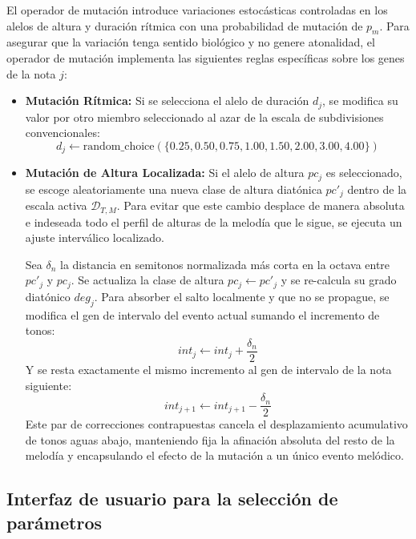 \documentclass[12pt]{report}
\begin{document}
El operador de mutación introduce variaciones estocásticas controladas en los alelos de altura y duración rítmica con una probabilidad de mutación de $p_m$. Para asegurar que la variación tenga sentido biológico y no genere atonalidad, el operador de mutación implementa las siguientes reglas específicas sobre los genes de la nota $j$:
\begin{itemize}
    \item \textbf{Mutación Rítmica:} Si se selecciona el alelo de duración $d_j$, se modifica su valor por otro miembro seleccionado al azar de la escala de subdivisiones convencionales:
    \begin{equation}
        d_j \leftarrow \text{random\_choice}(\{0.25, 0.50, 0.75, 1.00, 1.50, 2.00, 3.00, 4.00\})
    \end{equation}
    \item \textbf{Mutación de Altura Localizada:} Si el alelo de altura $pc_j$ es seleccionado, se escoge aleatoriamente una nueva clase de altura diatónica $pc'_j$ dentro de la escala activa $\mathcal{D}_{T,M}$. Para evitar que este cambio desplace de manera absoluta e indeseada todo el perfil de alturas de la melodía que le sigue, se ejecuta un ajuste interválico localizado. 
    
    Sea $\delta_n$ la distancia en semitonos normalizada más corta en la octava entre $pc'_j$ y $pc_j$. Se actualiza la clase de altura $pc_j \leftarrow pc'_j$ y se re-calcula su grado diatónico $deg_j$. Para absorber el salto localmente y que no se propague, se modifica el gen de intervalo del evento actual sumando el incremento de tonos:
    \begin{equation}
        int_j \leftarrow int_j + \frac{\delta_n}{2}
    \end{equation}
    Y se resta exactamente el mismo incremento al gen de intervalo de la nota siguiente:
    \begin{equation}
        int_{j+1} \leftarrow int_{j+1} - \frac{\delta_n}{2}
    \end{equation}
    Este par de correcciones contrapuestas cancela el desplazamiento acumulativo de tonos aguas abajo, manteniendo fija la afinación absoluta del resto de la melodía y encapsulando el efecto de la mutación a un único evento melódico.
\end{itemize}

\subsection{Interfaz de usuario para la selección de parámetros}
\end{document}
